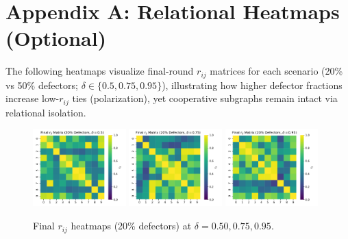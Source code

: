 \documentclass[11pt,a4paper]{article}
\begin{document}
\appendix
\section*{Appendix A: Relational Heatmaps (Optional)}
The following heatmaps visualize final-round $r_{ij}$ matrices for each scenario (20\% vs 50\% defectors; $\delta\in\{0.5,0.75,0.95\}$), illustrating how higher defector fractions increase low-$r_{ij}$ ties (polarization), yet cooperative subgraphs remain intact via relational isolation.

\begin{figure}[h!]
  \centering
  \includegraphics[width=0.32\textwidth]{rij_heatmap_20pct_delta_05.pdf}
  \includegraphics[width=0.32\textwidth]{rij_heatmap_20pct_delta_075.pdf}
  \includegraphics[width=0.32\textwidth]{rij_heatmap_20pct_delta_095.pdf}
  \caption{Final $r_{ij}$ heatmaps (20\% defectors) at $\delta=0.50,0.75,0.95$.}
\end{figure}
\end{document}
